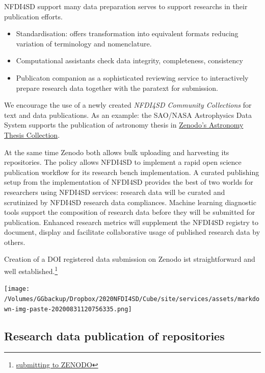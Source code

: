 \documentclass[
  english,
  paper=a4,
  oneside,captions=tableheading
]{scrbook}
\providecommand{\tightlist}{%
  \setlength{\itemsep}{0pt}\setlength{\parskip}{0pt}}
\begin{document}
NFDI4SD support many data preparation serves to support researchs in
their publication efforts.

\begin{itemize}
\tightlist
\item
  Standardisation: offers transformation into equivalent formats
  reducing variation of terminology and nomenclature.
\item
  Computational assistants check data integrity, completeness,
  consistency
\item
  Publicaton companion as a sophisticated reviewing service to
  interactively prepare research data together with the paratext for
  submission.
\end{itemize}

We encourage the use of a newly created \emph{NFDI4SD Community
Collections} for text and data publications. As an example: the SAO/NASA
Astrophysics Data System supports the publication of astronomy thesis in
\href{https://zenodo.org/communities/astrothesis?page=1\&size=20}{Zenodo's
Astronomy Thesis Collection}.

At the same time Zenodo both allows bulk uploading and harvesting its
repositories. The policy allows NFDI4SD to implement a rapid open
science publication workflow for its research bench implementation. A
curated publishing setup from the implementation of NFDI4SD provides the
best of two worlds for researchers using NFDI4SD services: research data
will be curated and scrutinized by NFDI4SD research data compliances.
Machine learning diagnostic tools support the composition of research
data before they will be submitted for publication. Enhanced research
metrics will supplement the NFDI4SD registry to document, display and
facilitate collaborative usage of published research data by others.

Creation of a DOI registered data submission on Zenodo ist
straightforward and well established.\footnote{\href{https://guides.github.com/activities/citable-code/}{submitting
  to ZENODO}}

\texttt{[image: /Volumes/GGbackup/Dropbox/2020NFDI4SD/Cube/site/services/assets/markdown-img-paste-20200831120756335.png]}

\hypertarget{research-data-publication-of-repositories}{%
\subsection{Research data publication of
repositories}\label{research-data-publication-of-repositories}}
\end{document}
